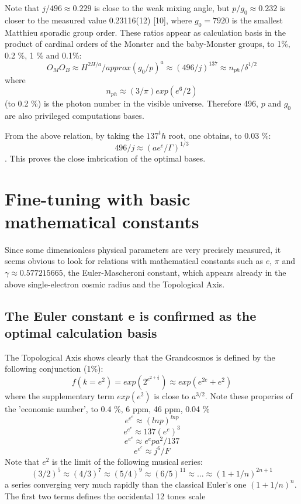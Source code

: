 \documentclass[twoside,draft]{article}
\begin{document}
\begin{sloppypar}
{Note that $j/496 \approx 0.229$ is close to the weak mixing angle, but $p/g_0 \approx 0.232$ is closer to the measured value 0.23116(12) [10], where $g_0 = 7920 $ is the smallest Matthieu sporadic group order. These ratios appear as calculation basis in the product of cardinal orders of the Monster and the baby-Monster groups, to 1\%, 0.2 \%, 1 \% and 0.1\%:
$$O_MO_B\approx H^{2H/a} /approx (g_0/p)^a \approx (496/j)^137 \approx  n_{ph}/\delta^{1/2} $$
where $$n_{ph}\approx (3/\pi) exp(e^6/2)$$ (to 0.2 \%) is the photon number in the visible universe. Therefore 496, $p$ and $g_0$ are also privileged computations bases. 

From the above relation, by taking the $137^th$ root, one obtains, to 0.03 \%: $$496/j \approx (ae^e/\Gamma)^{1/3}$$.
This proves the close imbrication of the optimal bases.

\section{Fine-tuning with basic mathematical constants}
Since some dimensionless physical parameters are very precisely measured, it seems obvious to look for
relations with mathematical constants such as $e$, $\pi$ and $\gamma \approx
0.577215665$, the Euler-Mascheroni constant, which appears already in the above single-electron
cosmic radius and the Topological Axis.

\subsection {The Euler constant e is confirmed as the optimal calculation basis}
    The Topological Axis shows clearly that the Grandcosmos is defined by the following conjunction (1\%):
\begin{equation}
f(k = e^{2}) = exp(2^{e^{2+\frac{1}{2}}}) \approx exp(e^{2e}+e^{2})
\end{equation}
where the supplementary term $exp(e^2)$ is close to $a^{3/2}$. Note these properies of the 'economic number', to 
0.4 \%, 6 ppm, 46 ppm, 0.04 \%  
$$e^{e^e}\approx (lnp)^{lnp}          $$
$$e^{e^e} \approx 137 (e^{e})^3   $$
$$e^{e^e} \approx e^e p a^2/137 $$
$$e^{e^e}\approx j^6/F $$
Note that $e^2$ is the limit of the following musical series:
$$(3/2)^5 \approx (4/3)^7   \approx (5/4)^9  \approx  (6/5)^{11}  \approx   ...  \approx  (1+1/n)^{2n+1}  $$  
a series converging very much rapidly than the classical Euler's one $(1+1/n)^n$. The first two terms defines the occidental 12 tones scale

}
\end{sloppypar}
\end{document}
